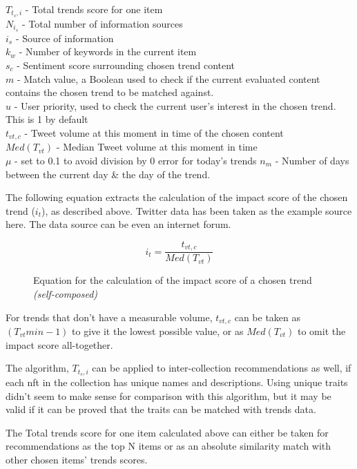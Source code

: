 \noindent$T_{t_{s},i}$ - Total trends score for one item\\
$N_{i_{s}}$ - Total number of information sources\\
$i_{s}$ - Source of information\\
$k_{w}$ - Number of keywords in the current item\\
$s_{c}$ - Sentiment score surrounding chosen trend content\\
$m$ - Match value, a Boolean used to check if the current evaluated content contains the chosen trend to be matched against. \\
$u$ - User priority, used to check the current user's interest in the chosen trend. This is 1 by default\\
$t_{vt,c}$ - Tweet volume at this moment in time of the chosen content \\
$Med(T_{vt})$ - Median Tweet volume at this moment in time\\
$\mu$ - set to 0.1 to avoid division by 0 error for today's trends
$n_{m}$ - Number of days between the current day \& the day of the trend.

\noindent The following equation extracts the calculation of the impact score of the chosen trend ($i_{t}$), as described above. Twitter data has been taken as the example source here. The data source can be even an internet forum.
\begin{figure}[h!]
\begin{equation}
i_{t} = \frac{t_{vt,c}}{Med(T_{vt})}
\end{equation}
\caption*{Equation for the calculation of the impact score of a chosen trend \textit{(self-composed)}}
\end{figure}

For trends that don't have a measurable volume, $t_{vt,c}$ can be taken as $\left(T_{vt}{min} - 1\right)$ to give it the lowest possible value, or as $Med(T_{vt})$ to omit the impact score all-together.

\bigbreak
The algorithm, $T_{t_{s},i}$ can be applied to inter-collection recommendations as well, if each \gls{nft} in the collection has unique names and descriptions. Using unique traits didn't seem to make sense for comparison with this algorithm, but it may be valid if it can be proved that the traits can be matched with trends data.

The Total trends score for one item calculated above can either be taken for recommendations as the top N items or as an absolute similarity match with other chosen items' trends scores.

